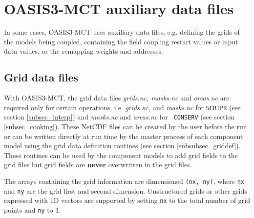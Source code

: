 \newpage
\chapter{OASIS3-MCT auxiliary data files}
\label{sec_auxiliary}

In some cases, OASIS3-MCT uses auxiliary data files, e.g. defining the
grids of the models being coupled, containing the field coupling
restart values or input data values, or the remapping weights and
addresses.

\section{Grid data files}
\label{subsec_griddata}

With OASIS3-MCT, the grid data files {\em grids.nc, masks.nc} and {\em
  areas.nc} are required only for certain operations, i.e.  {\em
  grids.nc}, and {\em masks.nc} for {\tt SCRIPR} (see section
\ref{subsec_interp}) and {\em masks.nc} and {\em areas.nc} for {\tt
  CONSERV} (see section \ref{subsec_cooking}). These NetCDF files can
be created by the user before the run or can be written directly at
run time by the master process of each component model using the grid
data definition routines (see section \ref{subsubsec_griddef}).  These
routines can be used by the component models to add grid fields to the
grid files but grid fields are {\bf never} overwritten in the grid
files.

The arrays containing the grid information are dimensioned {\tt (nx,
  ny)}, where {\tt nx} and {\tt ny} are the grid first and second
dimension.  Unstructured grids or other grids expressed with 1D
vectors are supported by setting {\tt nx} to the total number of grid
points and {\tt ny} to 1.

